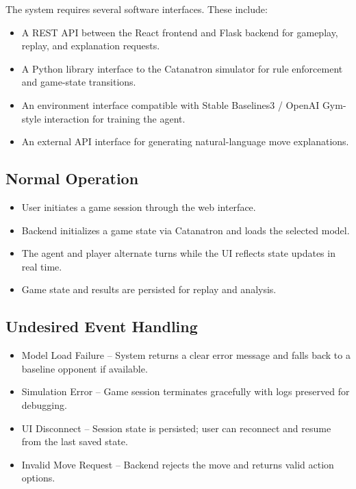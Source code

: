 \documentclass{article}
\begin{document}
The system requires several software interfaces. These include:
\begin{itemize}
    \item A REST API between the React frontend and Flask backend for gameplay, replay, and explanation requests.
    \item A Python library interface to the Catanatron simulator for rule enforcement and game-state transitions.
    \item An \RL{} environment interface compatible with Stable Baselines3 / OpenAI Gym-style interaction for training the \RL{} agent.
    \item An external \LLM{} API interface for generating natural-language move explanations.
\end{itemize}


\subsection{Normal Operation}\label{subsec:normal-operation}
\begin{itemize}
    \item User initiates a game session through the web interface.
    \item Backend initializes a game state via Catanatron and loads the selected \AI{} model.
    \item The \AI{} agent and player alternate turns while the UI reflects state updates in real time.
    \item Game state and results are persisted for replay and analysis.
\end{itemize}

\subsection{Undesired Event Handling}\label{subsec:undesired-event-handling}
\begin{itemize}
    \item {Model Load Failure} – System returns a clear error message and falls back to a baseline opponent if available.
    \item {Simulation Error} – Game session terminates gracefully with logs preserved for debugging.
    \item {UI Disconnect} – Session state is persisted; user can reconnect and resume from the last saved state.
    \item {Invalid Move Request} – Backend rejects the move and returns valid action options.
\end{itemize}
\end{document}
